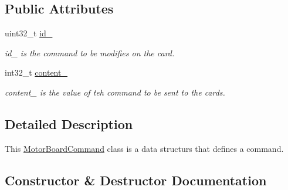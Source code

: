 \subsection*{Public Attributes}
\begin{DoxyCompactItemize}
\item 
uint32\+\_\+t \hyperlink{classblmc__drivers_1_1MotorBoardCommand_a31bfcc3cb1b2c35cbd5349123d884af4}{id\+\_\+}\hypertarget{classblmc__drivers_1_1MotorBoardCommand_a31bfcc3cb1b2c35cbd5349123d884af4}{}\label{classblmc__drivers_1_1MotorBoardCommand_a31bfcc3cb1b2c35cbd5349123d884af4}

\begin{DoxyCompactList}\small\item\em id\+\_\+ is the command to be modifies on the card. \end{DoxyCompactList}\item 
int32\+\_\+t \hyperlink{classblmc__drivers_1_1MotorBoardCommand_ac417b63a8cc8801a6757f4dce3b0810c}{content\+\_\+}\hypertarget{classblmc__drivers_1_1MotorBoardCommand_ac417b63a8cc8801a6757f4dce3b0810c}{}\label{classblmc__drivers_1_1MotorBoardCommand_ac417b63a8cc8801a6757f4dce3b0810c}

\begin{DoxyCompactList}\small\item\em content\+\_\+ is the value of teh command to be sent to the cards. \end{DoxyCompactList}\end{DoxyCompactItemize}


\subsection{Detailed Description}
This \hyperlink{classblmc__drivers_1_1MotorBoardCommand}{Motor\+Board\+Command} class is a data structurs that defines a command. 

\subsection{Constructor \& Destructor Documentation}
